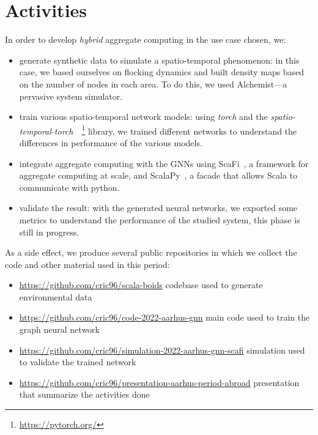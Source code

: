 \documentclass{article}
\begin{document}
\section{Activities}
In order to develop \emph{hybrid} aggregate computing in the use case chosen, we:
\begin{itemize}
\item generate synthetic data to simulate a spatio-temporal phenomenon: in this case, we based ourselves on flocking dynamics and built density maps based on the number of nodes in each area. To do this, we used Alchemist---a pervasive system simulator.
\item train various spatio-temporal network models: using \emph{torch} and the \emph{spatio-temporal-torch}~\cite{rozemberczki2021pytorch}~\footnote{\url{https://pytorch.org/}} library, we trained different networks to understand the differences in performance of the various models. 
\item integrate aggregate computing with the GNNs using ScaFi~\cite{casadei2022scafi}, a framework for aggregate computing at scale, and ScalaPy~\cite{laddad2020scalapy}, a facade that allows Scala to communicate with python.
\item validate the result: with the generated neural networks, we exported some metrics to understand the performance of the studied system, this phase is still in progress.
\end{itemize}
As a side effect, we produce several public repositories in which we collect the code and other material used in this period:
\begin{itemize}
\item \url{https://github.com/cric96/scala-boids} codebase used to generate environmental data
\item \url{https://github.com/cric96/code-2022-aarhus-gnn} main code used to train the graph neural network
\item \url{https://github.com/cric96/simulation-2022-aarhus-gnn-scafi} simulation used to validate the trained network
\item \url{https://github.com/cric96/presentation-aarhus-period-abroad} presentation that summarize the activities done
\end{itemize}
\end{document}
